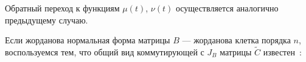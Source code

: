 







Обратный переход к функциям ${\mu}(t)$, ${\nu}(t)$ осуществляется аналогично предыдущему случаю.



\smallskip




Если жорданова нормальная форма матрицы $B$ --- жорданова клетка порядка $n$, воспользуемся тем, что общий вид коммутирующей с $J_B$ матрицы $\widetilde{C}$ известен~\cite{kozlova:bib:Gantmaher}:

